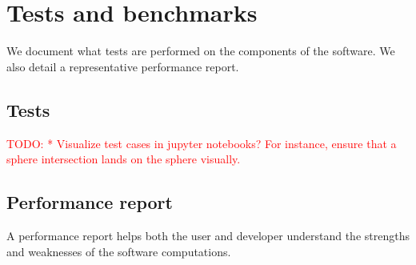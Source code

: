 \section{Tests and benchmarks}
We document what tests are performed on the components of the software.
We also detail a representative performance report.

\subsection{Tests}
\textcolor{red}{TODO:
* Visualize test cases in jupyter notebooks? For instance, ensure that
  a sphere intersection lands on the sphere visually.}

\subsection{Performance report}
A performance report helps both the user and developer understand the strengths
and weaknesses of the software computations.
